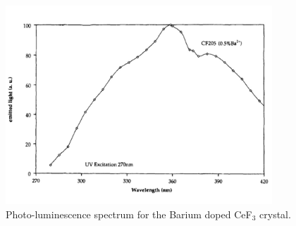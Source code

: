 \documentclass[a4paper,11pt]{article}
\begin{document}
\begin{figure}[ht]
\begin{center}
      \includegraphics[width=10cm]{Figures/SpectrumCeF3.pdf}
\caption{\small Photo-luminescence spectrum for the Barium doped CeF$_3$ crystal.}
    \label{fig:cef3spectrum}
\end{center}
\end{figure}
\end{document}
